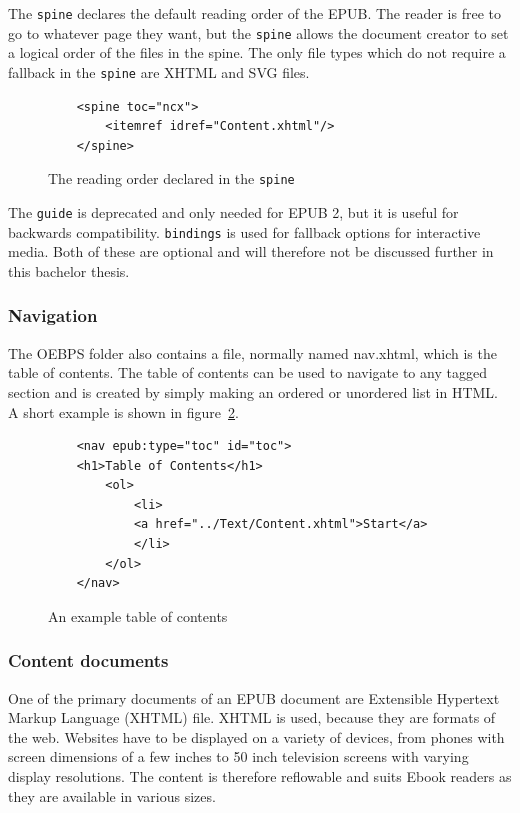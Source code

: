 The \lstinline{spine} declares the default reading order of the EPUB. The reader is free to go to whatever page they want, but the \lstinline|spine| allows the document creator to set a logical order of the files in the spine. The only file types which do not require a fallback in the \lstinline|spine| are XHTML and SVG files.\cite{EPUB3bp} 

\begin{figure}
	\begin{lstlisting}
	<spine toc="ncx">
		<itemref idref="Content.xhtml"/>
	</spine>
	\end{lstlisting}
	\caption{The reading order declared in the \lstinline{spine}}
	\label{fig:spine}
\end{figure}

The \lstinline|guide| is deprecated and only needed for EPUB 2, but it is useful for backwards compatibility. \lstinline|bindings| is used for fallback options for interactive media. Both of these are optional and will therefore not be discussed further in this bachelor thesis.

\subsubsection{Navigation}

The OEBPS folder also contains a file, normally named nav.xhtml, which is the table of contents. The table of contents can be used to navigate to any tagged section and is created by simply making an ordered or unordered list in HTML. A short example is shown in figure~\ref{fig:tableOfContents}. 

\begin{figure}
	\begin{lstlisting}
	<nav epub:type="toc" id="toc">
	<h1>Table of Contents</h1>
		<ol>
			<li>
			<a href="../Text/Content.xhtml">Start</a>
			</li>
		</ol>
	</nav>		
	\end{lstlisting}
	\caption{An example table of contents}
	\label{fig:tableOfContents}
\end{figure}

\subsubsection{Content documents}

One of the primary documents of an EPUB document are Extensible Hypertext Markup Language (XHTML) file. XHTML is used, because they are formats of the web. Websites have to be displayed on a variety of devices, from phones with screen dimensions of a few inches to 50 inch television screens with varying display resolutions. The content is therefore reflowable and suits Ebook readers as they are available in various sizes. 

